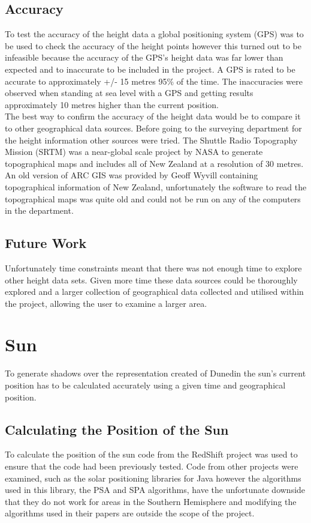 \documentclass[12pt]{report}
\begin{document}
\subsection{Accuracy}
To test the accuracy of the height data a global positioning system (GPS) was to be used to check the accuracy of the height points however this turned out to be infeasible because the accuracy of the GPS's height data was far lower than expected and to inaccurate to be included in the project. A GPS is rated to be accurate to approximately +/- 15 metres 95\% of the time\cite{gpsaltitude}. The inaccuracies were observed when standing at sea level with a GPS and getting results approximately 10 metres higher than the current position.\\

The best way to confirm the accuracy of the height data would be to compare it to other geographical data sources. Before going to the surveying department for the height information other sources were tried. The Shuttle Radio Topography Mission (SRTM)\cite{srtm} was a near-global scale project by NASA to generate topographical maps and includes all of New Zealand at a resolution of 30 metres. An old version of ARC GIS was provided by Geoff Wyvill containing topographical information of New Zealand, unfortunately the software to read the topographical maps was quite old and could not be run on any of the computers in the department.\\

\subsection{Future Work}
Unfortunately time constraints meant that there was not enough time to explore other height data sets.
 Given more time these data sources could be thoroughly explored and a larger collection of geographical data collected and utilised within the project, allowing the user to examine a larger area.

\section{Sun}
To generate shadows over the representation created of Dunedin the sun's current position has to be calculated accurately using a given time and geographical position.\\

\subsection{Calculating the Position of the Sun}
To calculate the position of the sun code from the RedShift project\cite{redshift} was used to ensure that the code had been previously tested. Code from other projects were examined, such as the solar positioning libraries for Java\cite{javasunlib} however the algorithms used in this library, the PSA\cite{psa} and SPA\cite{spa} algorithms, have the unfortunate downside that they do not work for areas in the Southern Hemisphere and modifying the algorithms used in their papers are outside the scope of the project.\\
\end{document}
